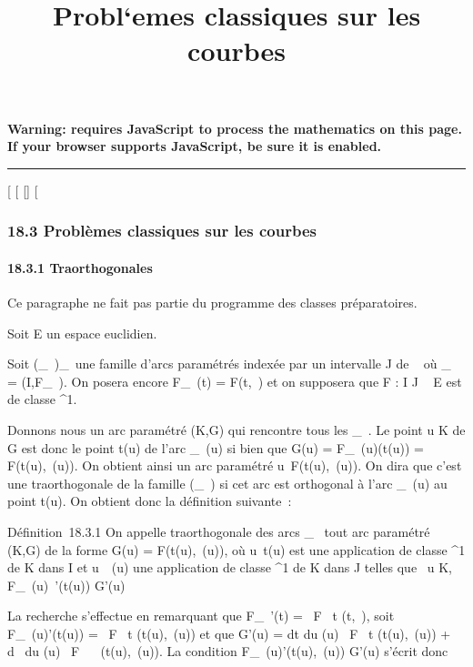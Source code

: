 \documentclass[]{article}
\title{Probl`emes classiques sur les courbes}
\author{}
\date{}
\begin{document}
\maketitle

\textbf{Warning: 
requires JavaScript to process the mathematics on this page.\\ If your
browser supports JavaScript, be sure it is enabled.}

\begin{center}\rule{3in}{0.4pt}\end{center}

{[}
{[}
{[}{]}
{[}

\subsubsection{18.3 Problèmes classiques sur les courbes}

\paragraph{18.3.1 Tra\jmathectoires orthogonales}

Ce paragraphe ne fait pas partie du programme des classes préparatoires.

Soit E un espace euclidien.

Soit (\Gamma\_\lambda~)\_\lambda~\inJ une famille d'arcs paramétrés indexée
par un intervalle J de ~ où \Gamma\_\lambda~ = (I,F\_\lambda~). On posera
encore F\_\lambda~(t) = F(t,\lambda~) et on supposera que F : I \times J \rightarrow~ E est de
classe ^1.

Donnons nous un arc paramétré (K,G) qui rencontre tous les \Gamma\_\lambda~.
Le point u \in K de G est donc le point t(u) de l'arc \Gamma\_\lambda~(u) si
bien que G(u) = F\_\lambda~(u)(t(u)) = F(t(u),\lambda~(u)). On obtient ainsi
un arc paramétré u\mapsto~F(t(u),\lambda~(u)). On dira que
c'est une tra\jmathectoire orthogonale de la famille (\Gamma\_\lambda~) si cet
arc est orthogonal à l'arc \Gamma\_\lambda~(u) au point t(u). On obtient
donc la définition suivante~:

Définition~18.3.1 On appelle tra\jmathectoire orthogonale des arcs
\Gamma\_\lambda~ tout arc paramétré (K,G) de la forme G(u) = F(t(u),\lambda~(u)),
où u\mapsto~t(u) est une application de classe
^1 de K dans I et u\mapsto~\lambda~(u) une
application de classe ^1 de K dans J telles que
\forall~u \in K, F\_\lambda~(u)~'(t(u)) \bot G'(u)

La recherche s'effectue en remarquant que F\_\lambda~'(t) = \partial~F
\over \partial~t (t,\lambda~), soit F\_\lambda~(u)'(t(u)) = \partial~F
\over \partial~t (t(u),\lambda~(u)) et que G'(u) = dt
\over du (u) \partial~F \over \partial~t (t(u),\lambda~(u))
+ d\lambda~ \over du (u) \partial~F \over \partial~\lambda~
(t(u),\lambda~(u)). La condition F\_\lambda~(u)'(t(u),\lambda~(u)) \bot G'(u) s'écrit
donc
\end{document}
